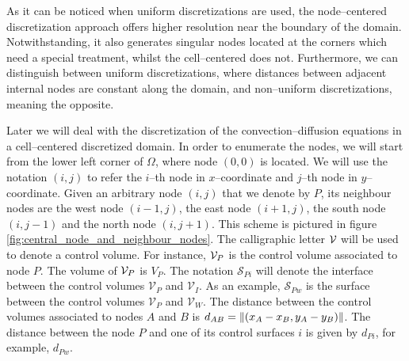 \noindent
As it can be noticed when uniform discretizations are used, the node--centered
discretization approach offers higher resolution near the boundary of the
domain. Notwithstanding, it also generates singular nodes located at the corners
which need a special treatment, whilst the cell--centered does not. Furthermore,
we can distinguish between uniform discretizations, where distances between
adjacent internal nodes are constant along the domain, and non--uniform
discretizations, meaning the opposite.

Later we will deal with the discretization of the convection--diffusion
equations in a cell--centered discretized domain. In order to enumerate the
nodes, we will start from the lower left corner of $\Omega$, where node $(0,0)$
is located. We will use the notation $(i,j)$ to refer the $i$--th node in
$x$--coordinate and $j$--th node in $y$--coordinate. Given an arbitrary node
$(i,j)$ that we denote by $P$, its neighbour nodes are the west node $(i-1,j)$,
the east node $(i+1,j)$, the south node $(i,j-1)$ and the north node $(i,j+1)$.
This scheme is pictured in figure \ref{fig:central_node_and_neighbour_nodes}.
The calligraphic letter $\mathcal{V}_{}$ will be used to denote a control volume. For
instance, $\mathcal{V}_{P}$ is the control volume associated to node $P$. The volume of
$\mathcal{V}_{P}$ is $V_P$. The notation $\mathcal{S}_{Pi}$ will denote the interface
between the control volumes $\mathcal{V}_P$ and $\mathcal{V}_I$. As an example,
$\mathcal{S}_{Pw}$ is the surface between the control volumes $\mathcal{V}_P$
and $\mathcal{V}_W$. The distance between the control volumes associated to
nodes $A$ and $B$ is $d_{AB} = \norm{(x_A - x_B, y_A - y_B)}$. The distance
between the node $P$ and one of its control surfaces $i$ is given by $d_{Pi}$,
for example, $d_{Pw}$. 

